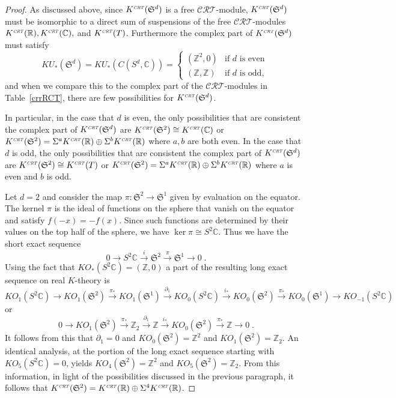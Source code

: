 \documentclass[12pt, reqno]{amsart}
\theoremstyle{definition}
\def\R{{\mathbb R}}
\def\C{{\mathbb C}}
\def\Z{{\mathbb Z}}
\def\pu{^{\scriptscriptstyle U}}
\def\crt{^{\scriptscriptstyle {\it CRT}}}
\def\CRT{\mathcal{CRT}}
\newcommand{\fS}{\mathfrak S}
\begin{document}
\begin{proof}
As discussed above, since $K\crt( \fS^d)$ is a free $\CRT$-module, $K\crt(\fS^d)$ must be isomorphic to a direct sum of suspensions of the free $\CRT$-modules $K\crt(\R), K\crt(\C),$ and $K\crt(T)$. Furthermore the complex part of $K\crt(\fS^d)$ must satisfy
$$KU_*( \fS^d) = KU_*(C(S^d, \C)) = \begin{cases} (\Z^2, 0) & \text{if $d$ is even } \\ (\Z, \Z) & \text{if $d$ is odd,} \end{cases} $$
and when we compare this to the complex part of the $\CRT$-modules in Table~\ref{crrRCT}, there are few possibilities for $K\crt(\fS^d)$.


In particular, in the case that $d$ is even,
the only possibilities that are consistent the complex part of $K\crt(\fS^d)$ are
$K\crt( \fS^2) \cong K\crt(\C)$ or $K\crt(\fS^2) = \Sigma^a K\crt(\R) \oplus \Sigma^b K\crt(\R)$ where $a,b$ are both even.
In the case that $d$ is odd,
the only possibilities that are consistent the complex part of $K\crt(\fS^d)$ are
$K\crt( \fS^2) \cong K\crt(T)$ or $K\crt(\fS^2) = \Sigma^a K\crt(\R) \oplus \Sigma^b K\crt(\R)$ where $a$ is even and $b$ is odd.

Let $d = 2$ and consider the map $\pi \colon \fS^2 \rightarrow \fS^1$ given by evaluation on the equator.
The kernel $\pi$ is the ideal of functions on the sphere that vanish on the equator and satisfy $f(-x) = -f(x)$. Since such functions are determined by their values on the top half of the sphere, we have $\ker \pi \cong S^2 \C$. Thus we have the short exact sequence
$$0 \rightarrow S^2 \C \xrightarrow{i} \fS^2 \xrightarrow{\pi} \fS^1 \rightarrow 0 \;. $$
Using the fact that $KO_*(S^2 \C) = (\Z, 0)$ a part of the resulting long exact sequence on real $K$-theory is
$$KO_1(S^2 \C) \rightarrow KO_1( \fS^2) \xrightarrow{\pi_*} KO_1( \fS^1) \xrightarrow{\partial_1} KO_0(S^2 \C) \xrightarrow{i_*} 
	KO_0( \fS^2) \xrightarrow{\pi_*} KO_0( \fS^1) \rightarrow KO_{-1}(S^2\C) $$
or 
$$0 \rightarrow KO_1( \fS^2) \xrightarrow{\pi_*} \Z_2 \xrightarrow{\partial_1} \Z \xrightarrow{i_*} 
	KO_0( \fS^2) \xrightarrow{\pi_*} \Z \rightarrow 0 \; .$$
It follows from this that $\partial_1 = 0$ and $KO_0(\fS^2) = \Z^2$ and $KO_1(\fS^2) = \Z_2$. An identical analysis, at the portion of the long exact sequence starting with $KO_5(S^2 \C) = 0$, yields $KO_4(\fS^2) = \Z^2$ and $KO_5(\fS^2) = \Z_2$. From this information, in light of the possibilities discussed in the previous paragraph, it follows that $K\crt(\fS^2) = K\crt(\R) \oplus \Sigma^4 K\crt(\R)$.


\end{proof}
\end{document}
